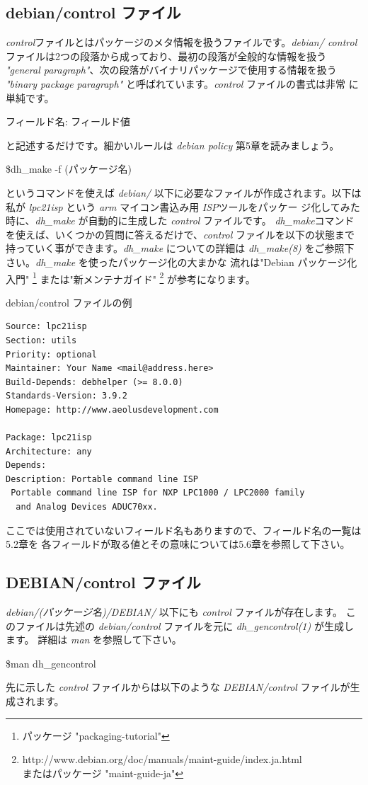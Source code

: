 \documentclass[mingoth,a4paper]{jsarticle}
\begin{document}
\subsection{debian/control ファイル}
{\it control}ファイルとはパッケージのメタ情報を扱うファイルです。{\it debian/
control}ファイルは2つの段落から成っており、最初の段落が全般的な情報を扱う {\it
"general paragraph"}、次の段落がバイナリパッケージで使用する情報を扱う {\it
"binary package paragraph"} と呼ばれています。{\it control} ファイルの書式は非常
に単純です。
\begin{screen}
フィールド名: フィールド値
\end{screen}
と記述するだけです。細かいルールは {\it debian policy} 第5章を読みましょう。
\begin{screen}
\$dh\_make -f (パッケージ名)
\end{screen}
というコマンドを使えば {\it debian/} 以下に必要なファイルが作成されます。以下は
私が {\it lpc21isp} という {\it arm} マイコン書込み用 {\it ISP}ツールをパッケー
ジ化してみた時に、{\it dh\_make} が自動的に生成した {\it control} ファイルです。
{\it dh\_make}コマンドを使えば、いくつかの質問に答えるだけで、{\it control}
ファイルを以下の状態まで持っていく事ができます。{\it dh\_make} についての詳細は
{\it dh\_make(8)} をご参照下さい。{\it dh\_make} を使ったパッケージ化の大まかな
流れは"Debian パッケージ化入門"
\footnote{パッケージ "packaging-tutorial"}
または"新メンテナガイド"
\footnote{http://www.debian.org/doc/manuals/maint-guide/index.ja.html\\
またはパッケージ "maint-guide-ja"}
が参考になります。
\begin{itembox}[l]{debian/control ファイルの例}
\begin{verbatim}
Source: lpc21isp
Section: utils
Priority: optional
Maintainer: Your Name <mail@address.here>
Build-Depends: debhelper (>= 8.0.0)
Standards-Version: 3.9.2
Homepage: http://www.aeolusdevelopment.com

Package: lpc21isp
Architecture: any
Depends:
Description: Portable command line ISP
 Portable command line ISP for NXP LPC1000 / LPC2000 family
  and Analog Devices ADUC70xx.
\end{verbatim}
\end{itembox}
ここでは使用されていないフィールド名もありますので、フィールド名の一覧は5.2章を
各フィールドが取る値とその意味については5.6章を参照して下さい。

\subsection{DEBIAN/control ファイル}
{\it debian/(パッケージ名)/DEBIAN/} 以下にも {\it control} ファイルが存在します。
このファイルは先述の {\it debian/control} ファイルを元に {\it dh\_gencontrol(1)} が生成します。
詳細は {\it man} を参照して下さい。\\
\begin{screen}
\$man dh\_gencontrol
\end{screen}
先に示した {\it control} ファイルからは以下のような {\it DEBIAN/control} ファイルが生成されます。
\end{document}
